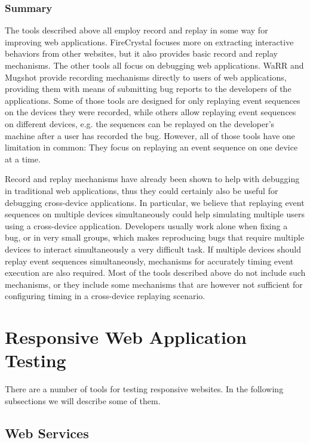 \subsubsection{Summary}

The tools described above all employ record and replay in some way for improving web applications. FireCrystal focuses more on extracting interactive behaviors from other websites, but it also provides basic record and replay mechanisms. The other tools all focus on debugging web applications. WaRR and Mugshot provide recording mechanisms directly to users of web applications, providing them with means of submitting bug reports to the developers of the applications. Some of those tools are designed for only replaying event sequences on the devices they were recorded, while others allow replaying event sequences on different devices, e.g. the sequences can be replayed on the developer's machine after a user has recorded the bug. However, all of those tools have one limitation in common: They focus on replaying an event sequence on one device at a time. 

Record and replay mechanisms have already been shown to help with debugging in traditional web applications, thus they could certainly also be useful for debugging cross-device applications. In particular, we believe that replaying event sequences on multiple devices simultaneously could help simulating multiple users using a cross-device application. Developers usually work alone when fixing a bug, or in very small groups, which makes reproducing bugs that require multiple devices to interact simultaneously a very difficult task. If multiple devices should replay event sequences simultaneously, mechanisms for accurately timing event execution are also required. Most of the tools described above do not include such mechanisms, or they include some mechanisms that are however not sufficient for configuring timing in a cross-device replaying scenario.

\section{Responsive Web Application Testing}

There are a number of tools for testing responsive websites. In the following subsections we will describe some of them.

\subsection{Web Services}

